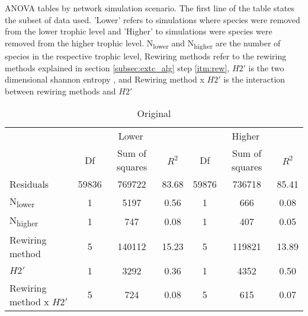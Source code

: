 \documentclass[12pt,a4paper]{article}
\begin{document}
\begin{table}[H]
\caption[ANOVA for each network simulation scenario]{ANOVA tables by network simulation scenario. The first line of the table states the subset of data used. 'Lower' refers to simulations where species were removed from the lower trophic level and 'Higher' to simulations were species were removed from the higher trophic level. N\textsubscript{lower} and N\textsubscript{higher} are the number of species in the respective trophic level, Rewiring methods refer to the rewiring methods explained in section \ref{subsec:extc_alg} step \ref{itm:rew}, $H2'$ is the two dimensional shannon entropy \parencite{Bluethgen2006}, and Rewiring method x $H2'$ is the interaction between rewiring methods and $H2'$}
\label{tab:anova_by_cv}
    \begin{subtable}{\linewidth}
    \caption{Original}
    \centering
\begin{tabularx}{\linewidth}{@{} X *6{c} @{}}
\toprule
  & \multicolumn{3}{c}{Lower} & \multicolumn{3}{c}{Higher} \\ \cmidrule(l){2-4} \cmidrule(l){5-7}
  						& Df		& Sum of squares	& $R^2$	& Df 	& Sum of squares	& $R^2$ \\ \midrule
Residuals 				& 59836 & 769722			& 83.68	& 59876 & 736718 		& 85.41   \\
N\textsubscript{lower} 	& 1 		& 5197 			& 0.56 	& 1		& 666 			& 0.08  \\
N\textsubscript{higher} 	& 1 		& 747 			& 0.08	& 1 		& 407 			& 0.05  \\
Rewiring method 			& 5 		& 140112 		& 15.23 	& 5 		& 119821			& 13.89  \\
$H2'$ 					& 1 		& 3292 			& 0.36 	& 1 		& 4352			& 0.50 \\
Rewiring method x $H2'$ 	& 5 		& 724 			& 0.08 	& 5 		& 615			& 0.07  \\ \bottomrule
\end{tabularx}
\end{subtable}


\end{table}
\end{document}
